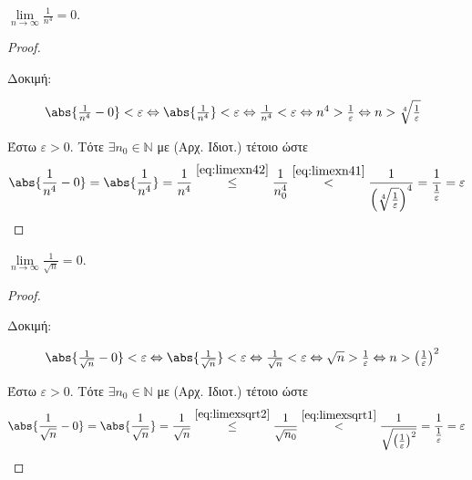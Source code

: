 \documentclass[main.tex]{subfiles}
\begin{document}
\begin{examples}
\begin{enumerate}[i)]
    \item $ \lim\limits_{n \to \infty} \frac{1}{n^{4}} = 0 $. 
      \begin{proof}
      \item {}
        \begin{description}
          \item[Δοκιμή:]$ \abs{\frac{1}{n^{4}} - 0} < \varepsilon 
            \Leftrightarrow \abs{\frac{1}{n^{4}}} < \varepsilon 
            \Leftrightarrow \frac{1}{n^{4}} < \varepsilon
            \Leftrightarrow n^{4} > \frac{1}{\varepsilon}
            \Leftrightarrow n > \sqrt[4]{\frac{1}{\varepsilon}}$
        \end{description}
        Έστω $ \varepsilon >0 $. Τότε $ \exists n_{0}  \in 
        \mathbb{N}$ με  (Αρχ. Ιδιοτ.)
        τέτοιο ώστε  
        \[
          \abs{\frac{1}{n^{4}} - 0 } = \abs{\frac{1}{n^{4}}} 
          = \frac{1}{n^{4}} \overset{\eqref{eq:limexn42}}\leq 
          \frac{1}{n_{0}^{4}} \overset{\eqref{eq:limexn41}}{<}
          \frac{1}{\left(\sqrt[4]{\frac{1}{\varepsilon}
          }\right)^{4}} = \frac{1}{\frac{1}{\varepsilon}} =  
          \varepsilon
        \] 
      \end{proof}

    \item $ \lim\limits_{n \to \infty} \frac{1}{\sqrt{n}} = 0$.
      \begin{proof}
      \item {}
        \begin{description}
          \item[Δοκιμή:] $ \abs{\frac{1}{\sqrt{n}}-0 } 
            < \varepsilon 
            \Leftrightarrow \abs{\frac{1}{\sqrt{n}} } < 
            \varepsilon 
            \Leftrightarrow \frac{1}{\sqrt{n}} < 
            \varepsilon \Leftrightarrow \sqrt{n} >
            \frac{1}{\varepsilon} \Leftrightarrow n >
            \left(\frac{1}{\varepsilon}\right)^{2}
            $
        \end{description}
        Έστω $ \varepsilon > 0 $. Τότε $ \exists n_{0} \in 
        \mathbb{N} $
        με  (Αρχ. Ιδιοτ.) τέτοιο ώστε 
        \[
          \abs{\frac{1}{\sqrt{n}} -0} = \abs{\frac{1}{\sqrt{n}}} =
          \frac{1}{\sqrt{n}} \overset{\eqref{eq:limexsqrt2}}{\leq}
          \frac{1}{\sqrt{n_{0}}} \overset{\eqref{eq:limexsqrt1}}
          {<} \frac{1}{\sqrt{\left(\frac{1}{\varepsilon}\right)
          ^{2}}} = \frac{1}{\frac{1}{\varepsilon}} = \varepsilon
        \] 
      \end{proof}


\end{enumerate}
\end{examples}
\end{document}
